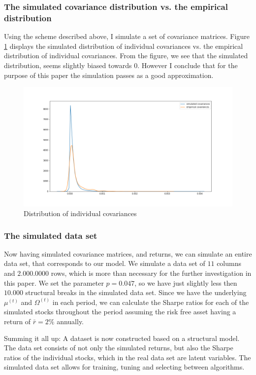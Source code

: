\subsubsection{The simulated covariance distribution vs. the empirical distribution}

Using the scheme described above, I simulate a set of covariance matrices. Figure \ref{fig:distcovars} displays the simulated distribution of individual covariances vs. the empirical distribution of individual covariances. From the figure, we see that the simulated distribution, seems slightly biased towards 0. However I conclude that for the purpose of this paper the simulation passes as a good approximation.

\begin{figure}[ht]
\centering
\includegraphics[scale=0.3]{figures/dist_simulated_covariances.png}
\caption{Distribution of individual covariances}
\label{fig:distcovars}
\end{figure}

\subsubsection{The simulated data set}

Now having simulated covariance matrices, and returns, we can simulate an entire data set, that corresponds to our model. We simulate a data set of $11$ columns and $2.000.0000$ rows, which is more than necessary for the further investigation in this paper. We set the parameter $p=0.047$, so we have just slightly less then $10.000$ structural breaks in the simulated data set. Since we have the underlying $\mu^{(t)}$ and $\Omega^{(t)}$ in each period, we can calculate the Sharpe ratios for each of the simulated stocks throughout the period assuming the risk free asset having a return of $\bar{r}=2 \%$ annually.

Summing it all up: A dataset is now constructed based on a structural model. The data set consists of not only the simulated returns, but also the Sharpe ratios of the individual stocks, which in the real data set are latent variables. The simulated data set allows for training, tuning and selecting between algorithms.


